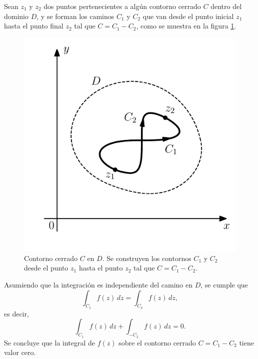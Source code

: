\documentclass[a4paper]{report}
\begin{document}
Sean \(z_1\) y \(z_2\) dos puntos pertenecientes a algún contorno cerrado \(C\) dentro del dominio \(D\), y se forman los caminos \(C_1\) y \(C_2\) que van desde el punto inicial \(z_1\) hasta el punto final \(z_2\) tal que \(C=C_1-C_2\), como se muestra en la figura \ref{fig:antiderivatives_theorem}.
\begin{figure}[!htb]
  \begin{minipage}[c]{0.45\textwidth}
    \includegraphics[width=\textwidth]{figuras/antiderivatives_theorem.pdf}
  \end{minipage}\hfill
  \begin{minipage}[c]{0.45\textwidth}
    \caption{
        Contorno cerrado \(C\) en \(D\). Se construyen los contornos \(C_1\) y \(C_2\) desde el punto \(z_1\) hasta el punto \(z_2\) tal que \(C=C_1-C_2\).
    }\label{fig:antiderivatives_theorem}
  \end{minipage}
\end{figure}
Asumiendo que la integración es independiente del camino en \(D\), se cumple que 
\begin{equation}\label{eq:antiderivatives_theorem_two_paths}
 \int_{C_1}f(z)\,dz=\int_{C_2}f(z)\,dz, 
\end{equation}
es decir,
\begin{equation}\label{eq:antiderivatives_theorem_closed_paths}
 \int_{C_1}f(z)\,dz+\int_{-C_2}f(z)\,dz=0. 
\end{equation}
Se concluye que la integral de \(f(z)\) sobre el contorno cerrado \(C=C_1-C_2\) tiene valor cero.
\end{document}
